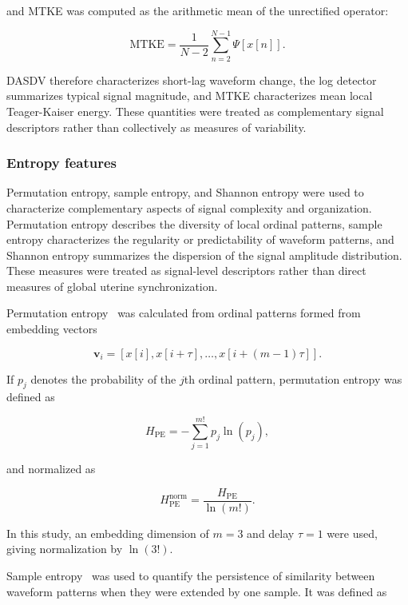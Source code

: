 \documentclass[10pt,letterpaper]{article}
\begin{document}
and MTKE was computed as the arithmetic mean of the unrectified operator:

\begin{equation}
\mathrm{MTKE}
=
\frac{1}{N-2}
\sum_{n=2}^{N-1}
\Psi[x[n]].
\end{equation}

DASDV therefore characterizes short-lag waveform change, the log detector summarizes typical signal magnitude, and MTKE characterizes mean local Teager-Kaiser energy. These quantities were treated as complementary signal descriptors rather than collectively as measures of variability.

\subsubsection*{Entropy features}

Permutation entropy, sample entropy, and Shannon entropy were used to characterize complementary aspects of signal complexity and organization. Permutation entropy describes the diversity of local ordinal patterns, sample entropy characterizes the regularity or predictability of waveform patterns, and Shannon entropy summarizes the dispersion of the signal amplitude distribution. These measures were treated as signal-level descriptors rather than direct measures of global uterine synchronization.

Permutation entropy~\cite{BandtPompe2002} was calculated from ordinal patterns formed from embedding vectors

\begin{equation}
\mathbf{v}_i =
[x[i],x[i+\tau],\ldots,x[i+(m-1)\tau]].
\end{equation}

If $p_j$ denotes the probability of the $j$th ordinal pattern, permutation entropy was defined as

\begin{equation}
H_{\mathrm{PE}}
=
-\sum_{j=1}^{m!} p_j \ln(p_j),
\end{equation}

and normalized as

\begin{equation}
H_{\mathrm{PE}}^{\mathrm{norm}}
=
\frac{H_{\mathrm{PE}}}{\ln(m!)}.
\end{equation}

In this study, an embedding dimension of $m=3$ and delay $\tau=1$ were used, giving normalization by $\ln(3!)$.

Sample entropy~\cite{RichmanMoorman2000} was used to quantify the persistence of similarity between waveform patterns when they were extended by one sample. It was defined as
\end{document}
